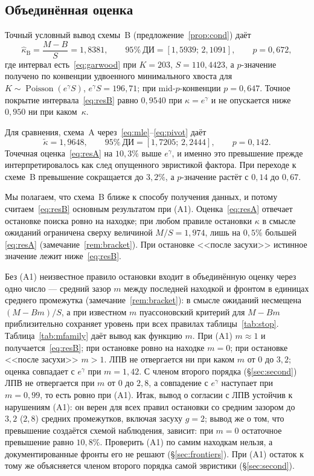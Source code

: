 \documentclass[11pt,a4paper]{article}
\theoremstyle{plain}
\theoremstyle{remark}
\newcommand{\eg}{e^{\gamma}}
\DeclareMathOperator{\Pois}{Poisson}
\begin{document}
\subsection{Объединённая оценка}\label{sec:pooled}

Точный условный вывод схемы~B (предложение~\ref{prop:cond}) даёт
\begin{equation}\label{eq:resB}
\hat\kappa_{\mathrm B}=\frac{M-B}{S}=1{,}8381,\qquad
95\%\ \text{ДИ}=[1{,}5939;\,2{,}1091],\qquad p=0{,}672,
\end{equation}
где интервал есть~\eqref{eq:garwood} при $K=203$, $S=110{,}4423$, а $p$-значение
получено по конвенции удвоенного минимального хвоста для
$K\sim\Pois(\eg S)$, $\eg S=196{,}71$; при mid-$p$-конвенции $p=0{,}647$.
Точное покрытие интервала~\eqref{eq:resB} равно $0{,}9540$ при $\kappa=\eg$ и не
опускается ниже $0{,}950$ ни при каком~$\kappa$.

Для сравнения, схема~A через~\eqref{eq:mle}--\eqref{eq:pivot} даёт
\begin{equation}\label{eq:resA}
\tilde\kappa=1{,}9648,\qquad 95\%\ \text{ДИ}=[1{,}7205;\,2{,}2444],\qquad p=0{,}142 .
\end{equation}
Точечная оценка~\eqref{eq:resA} на $10{,}3\%$ выше $\eg$, и именно это превышение
прежде интерпретировалось как след опущенного эвристикой фактора. При переходе к
схеме~B превышение сокращается до $3{,}2\%$, а $p$-значение растёт с $0{,}14$
до $0{,}67$.

Мы полагаем, что схема~B ближе к способу получения данных, и потому
считаем~\eqref{eq:resB} основным результатом при (A1). Оценка~\eqref{eq:resA}
отвечает остановке поиска ровно на находке; при любом правиле остановки $\kappa$ в
смысле ожиданий ограничена сверху величиной $M/S=1{,}974$, лишь на $0{,}5\%$
большей \eqref{eq:resA} (замечание~\ref{rem:bracket}). При остановке <<после
засухи>> истинное значение лежит ниже~\eqref{eq:resB}.

Без (A1) неизвестное правило остановки входит в объединённую оценку через одно
число --- средний зазор $m$ между последней находкой и фронтом в единицах среднего
промежутка (замечание~\ref{rem:bracket}): в смысле ожиданий несмещена $(M-Bm)/S$, а
при известном $m$ пуассоновский критерий для $M-Bm$ приблизительно сохраняет
уровень при всех правилах таблицы~\ref{tab:stop}. Таблица~\ref{tab:mfamily} даёт вывод как функцию $m$. При
(A1) $m\approx1$ и получается~\eqref{eq:resB}; при остановке ровно на находке $m=0$;
при остановке <<после засухи>> $m>1$. ЛПВ не отвергается ни при каком $m$ от $0$ до
$3{,}2$; оценка совпадает с $\eg$ при $m=1{,}42$. С членом второго порядка
(\S\ref{sec:second}) ЛПВ не отвергается при $m$ от $0$ до $2{,}8$, а совпадение с
$\eg$ наступает при $m=0{,}99$, то есть ровно при (A1). Итак, вывод о согласии с ЛПВ
устойчив к нарушениям (A1): он верен для всех правил остановки со средним
зазором до $3{,}2$ ($2{,}8$) средних промежутков, включая засуху $g=2$; вывод же о
том, что превышение создаётся схемой наблюдения, зависит: при $m=0$ остаточное превышение равно $10{,}8\%$. Проверить (A1) по самим
находкам нельзя, а документированные фронты его не решают (\S\ref{sec:frontiers}).
При (A1) остаток к тому же объясняется членом второго порядка самой эвристики
(\S\ref{sec:second}).
\end{document}
